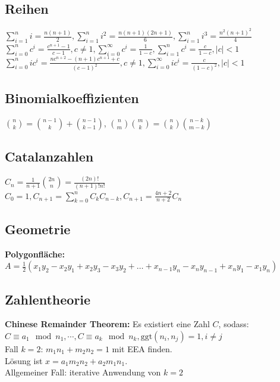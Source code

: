 \documentclass[10pt,a4paper,ngerman,oneside,]{article}
\begin{document}
\begin{multicols}{2}
\subsection{Reihen}
$
\sum\limits_{i=1}^{n}i=\frac{n(n+1)}{2}, \sum\limits_{i=1}^{n}i^2=\frac{n(n+1)(2n+1)}{6}, \sum\limits_{i=1}^{n}i^3=\frac{n^2(n+1)^2}{4}
$\\
$
\sum\limits_{i=0}^{n}c^i=\frac{c^{n+1}-1}{c-1},c\neq 1, \sum\limits_{i=0}^{\infty}c^i=\frac{1}{1-c}, \sum\limits_{i=1}^{n}c^i=\frac{c}{1-c},|c|<1
$\\
$
\sum\limits_{i=0}^{n}ic^i=\frac{nc^{n+2}-(n+1)c^{n+1}+c}{(c-1)^2}, c\neq 1, \sum\limits_{i=0}^{\infty}ic^i=\frac{c}{(1-c)^2}, |c|<1
$

\subsection{Binomialkoeffizienten}
$
{n \choose k} = {n-1 \choose k} + {n-1 \choose k-1}
$,
$
{n \choose m}{m \choose k} = {n \choose k}{n-k \choose m-k}
$

\subsection{Catalanzahlen}
$
C_n=\frac{1}{n+1}\binom{2n}{n}=\frac{(2n)!}{(n+1)!n!}
$\\
$
C_0=1, C_{n+1}=\sum\limits_{k=0}^{n}C_kC_{n-k}, C_{n+1}=\frac{4n+2}{n+2}C_n
$

\subsection{Geometrie}
\textbf{Polygonfläche:} $A=\frac{1}{2}(x_1y_2-x_2y_1+x_2y_3-x_3y_2+\dots+x_{n-1}y_n-x_ny_{n-1}+x_ny_1-x_1y_n)$


\subsection{Zahlentheorie}
\textbf{Chinese Remainder Theorem:} Es existiert eine Zahl $C$, sodass:\\
$
C\equiv a_1\mod n_1,\cdots, C\equiv a_k\mod n_k, \mathrm{ggt}(n_i,n_j)=1,i\neq j
$\\
Fall $k=2$: $m_1n_1+m_2n_2=1$ mit EEA finden.\\
Lösung ist $x=a_1m_2n_2+a_2m_1n_1$.\\
Allgemeiner Fall: iterative Anwendung von $k=2$


\end{multicols}
\end{document}
